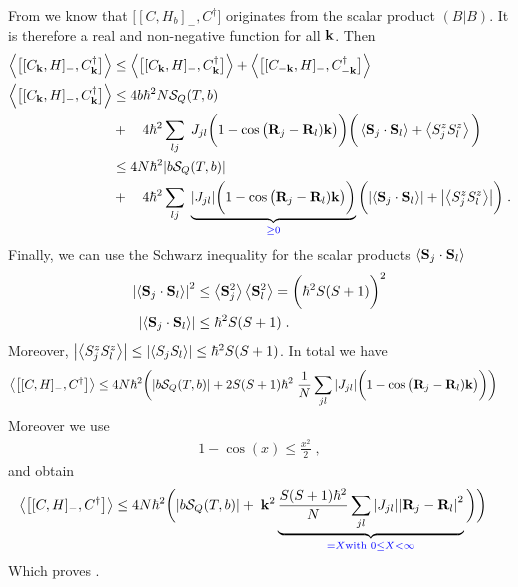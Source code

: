 %
From  we know  that $\big[[C,H_{b}]_{-},C^{\dagger}\big] $ originates from the scalar product  $(B|B)$. It is therefore a real and non-negative function for all $\mathbf k$. Then
%
\begin{align*}
\left\langle\big[[C_{\mathbf k},H]_{-},C^{\dagger}_{\mathbf k}\big] \right\rangle &\le 
\left\langle\big[[C_{\mathbf k},H]_{-},C^{\dagger}_{\mathbf k}\big] \right\rangle+
\left\langle\big[[C_{-\mathbf k},H]_{-},C^{\dagger}_{-\mathbf k}\big] \right\rangle
\\
\left\langle\big[[C_{\mathbf k},H]_{-},C^{\dagger}_{\mathbf k}\big] \right\rangle  &\le 4 b\hbar^{2} N {\cal S}_{Q}(T,b)\\
&+\quad 4\hbar^{2} \sum_{lj}\;J_{jl}
  \bigg(1 - \cos\big(\mathbf R_{j}-\mathbf R_{l})\mathbf k\big) \bigg)
\bigg( \left\langle\mathbf S_{j}\cdot \mathbf S_{l}\right\rangle
+\left\langle S^{z}_{j}S^{z}_{l}\right\rangle\bigg)\\
&\le 4 N\hbar^{2}  \abs{b{\cal S}_{Q}(T,b)}\\
&+\quad 4\hbar^{2} \sum_{lj}\;
\underbrace{
\abs{J_{jl}}
  \bigg(1 - \cos\big(\mathbf R_{j}-\mathbf R_{l})\mathbf k\big) \bigg)
}_{\color{blue}  \ge 0}
\bigg( \abs{\left\langle\mathbf S_{j}\cdot \mathbf S_{l}\right\rangle}
+\abs{\left\langle S^{z}_{j}S^{z}_{l}\right\rangle}\bigg)\;.
\end{align*}
%
Finally, we can use the Schwarz inequality for the scalar products $\left\langle\mathbf S_{j} \cdot \mathbf S	_{l}\right\rangle$
%
\begin{align*}
\abs{\left\langle\mathbf S_{j} \cdot \mathbf S	_{l}\right\rangle}^{2} &\le 
\left\langle\mathbf S_{j}^{2}\right\rangle
\left\langle\mathbf S_{l}^{2} \right\rangle
 =\bigg(\hbar^{2} S(S+1)\bigg)^{2}\\
 \abs{\left\langle\mathbf S_{j} \cdot \mathbf S	_{l}\right\rangle}&\le \hbar^{2}S(S+1)\;.
\end{align*}
%
Moreover, $\abs{\left\langle S^{z}_{j}S^{z}_{l}\right\rangle}\le \abs{\left\langle S_{j}S_{l}\right\rangle}\le \hbar^{2}S(S+1)$.
In total we have
%
\begin{align*}
\left\langle\big[[C,H]_{-},C^{\dagger}\big] \right\rangle &\le 
4 N \hbar^{2}  \bigg(\abs{b{\cal S}_{Q}(T,b)}
+ 2S(S+1)\hbar^{2}\;
\frac{1}{N}\sum_{jl}\abs{J_{jl}}
  \bigg(1 - \cos\big(\mathbf R_{j}-\mathbf R_{l})\mathbf k\big) \bigg)
\bigg)
\end{align*}
%
Moreover we use
%
\begin{align*}
1-\cos(x) \le \frac{x^{2}}{2}\;,
\end{align*}
%
and obtain
\begin{align*}
\left\langle\big[[C,H]_{-},C^{\dagger}\big] \right\rangle &\le 
4 N \hbar^{2}  \bigg(\abs{b{\cal S}_{Q}(T,b)}
+ \;\mathbf k^{2}
\underbrace{
\frac{S(S+1)\hbar^{2}}{N}\sum_{jl}\abs{J_{jl}}\abs{\mathbf R_{j}-\mathbf R_{l}}^{2}
}_{\color{blue} = X \text{with } 0\le X < \infty}
   \bigg)
\bigg)
\end{align*}
Which proves .
